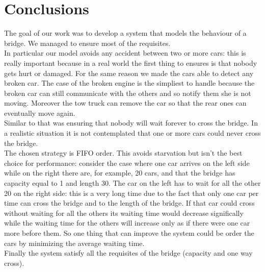 \chapter{Conclusions}\label{ch:conclusions}

The goal of our work was to develop a system that models the behaviour of a bridge. We managed to ensure
most of the requisites.\\ In particular our model avoids any accident between two or more cars: this is 
really important because in a real world the first thing to ensures is that nobody gets hurt or damaged. 
For the same reason we made the cars able to detect any broken car. The case of the broken engine is the simpliest
to handle because the broken car can still communicate with the others and so notify them she is not moving.
Moreover the tow truck can remove the car so that the rear ones can eventually move again.\\ Similar to that
was ensuring that nobody will wait forever to cross the bridge. In a realistic situation it is not contemplated
that one or more cars could never cross the bridge.\\
The chosen strategy is FIFO order. This avoids starvation but isn't the best choice for performance: consider
the case where one car arrives on the left side while on the right there are, for example, 20 cars, and that the bridge
has capacity equal to 1 and length 30. The car on the left has to wait for all the other 20 on the right side: this 
is a very long time due to the fact that only one car per time can cross the bridge and to the length of the bridge.
If that car could cross without waiting for all the others its waiting time would decrease significally while
the waiting time for the others will increase only as if there were one car more before them. So one thing 
that can improve the system could be order the cars by minimizing the average waiting time.\\
Finally the system satisfy all the requisites of the bridge (capacity and one way cross).
